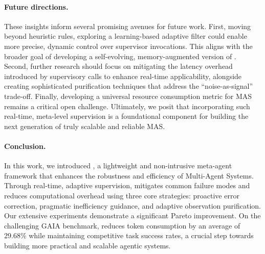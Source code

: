 \paragraph{Future directions.}
These insights inform several promising avenues for future work. First, moving beyond heuristic rules, exploring a learning-based adaptive filter could enable more precise, dynamic control over supervisor invocations. This aligns with the broader goal of developing a self-evolving, memory-augmented version of \method{}. Second, further research should focus on mitigating the latency overhead introduced by supervisory calls to enhance real-time applicability, alongside creating sophisticated purification techniques that address the ``noise-as-signal'' trade-off. Finally, developing a universal resource consumption metric for MAS remains a critical open challenge. Ultimately, we posit that incorporating such real-time, meta-level supervision is a foundational component for building the next generation of truly scalable and reliable MAS.

\paragraph{Conclusion.}

In this work, we introduced \textbf{\method}, a lightweight and non-intrusive meta-agent framework that enhances the robustness and efficiency of Multi-Agent Systems. Through real-time, adaptive supervision, \method{} mitigates common failure modes and reduces computational overhead using three core strategies: proactive error correction, pragmatic inefficiency guidance, and adaptive observation purification. Our extensive experiments demonstrate a significant Pareto improvement. On the challenging GAIA benchmark, \method{} reduces token consumption by an average of 29.68\% while maintaining competitive task success rates, a crucial step towards building more practical and scalable agentic systems.

